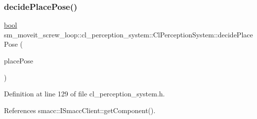 \subsubsection{\texorpdfstring{decide\+Place\+Pose()}{decidePlacePose()}}
{\footnotesize\ttfamily \hyperlink{classbool}{bool} sm\+\_\+moveit\+\_\+screw\+\_\+loop\+::cl\+\_\+perception\+\_\+system\+::\+Cl\+Perception\+System\+::decide\+Place\+Pose (\begin{DoxyParamCaption}\item[{geometry\+\_\+msgs\+::\+Pose\+Stamped \&}]{place\+Pose }\end{DoxyParamCaption})\hspace{0.3cm}{\ttfamily [inline]}}



Definition at line 129 of file cl\+\_\+perception\+\_\+system.\+h.



References smacc\+::\+I\+Smacc\+Client\+::get\+Component().


